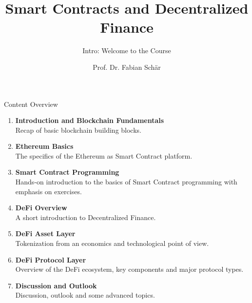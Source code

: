 \documentclass[handout]{beamer}
\title{Smart Contracts and Decentralized Finance}
\subtitle{Intro: Welcome to the Course}
\author{Prof. Dr. Fabian Schär}
\institute{University of Basel}
\begin{document}
\thispagestyle{empty}
\begin{frame}[noframenumbering]
	\titlepage
\end{frame}

\begin{frame}{Content Overview}
\small
\begin{enumerate}
	\item<1-> \textbf{Introduction and Blockchain Fundamentals}\\
		Recap of basic blockchain building blocks.
		\vspace{0.2em}
	\item<2-> \textbf{Ethereum Basics}\\
		The specifics of the Ethereum as Smart Contract platform.
		\vspace{0.2em}
	\item<3-> \textbf{Smart Contract Programming}\\
		Hands-on introduction to the basics of Smart Contract programming with emphasis on exercises.		
	\item<4-> \textbf{DeFi Overview}\\
		A short introduction to Decentralized Finance.
		\vspace{0.2em}
	\item<5-> \textbf{DeFi Asset Layer}\\
		Tokenization from an economics and technological point of view.
		\vspace{0.2em}
	\item<6-> \textbf{DeFi Protocol Layer}\\
			Overview of the DeFi ecosystem, key components and major protocol types.
	\item<7-> \textbf{Discussion and Outlook}\\
			Discussion, outlook and some advanced topics.
\end{enumerate}

\end{frame}
\end{document}
